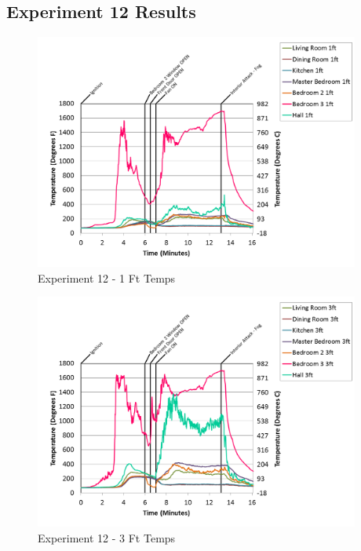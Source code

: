 \documentclass{article}
\begin{document}
\begin{appendices}
\clearpage
\clearpage		\large
\subsection{Experiment 12 Results} \label{App:Exp12Results} 

\begin{figure}[h!]
	\centering
	\includegraphics[height=3.05in]{0_Images/Results_Charts/Exp_12_Charts/1FtTemps.png}
	\caption{Experiment 12 - 1 Ft Temps}
\end{figure}


\begin{figure}[h!]
	\centering
	\includegraphics[height=3.05in]{0_Images/Results_Charts/Exp_12_Charts/3FtTemps.png}
	\caption{Experiment 12 - 3 Ft Temps}
\end{figure}

\clearpage


\end{appendices}
\end{document}
